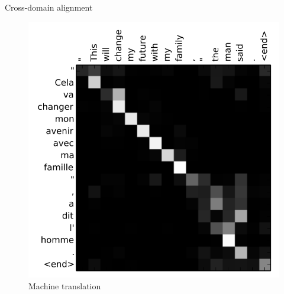 \documentclass{beamer}
\newcommand{\gw}{\text{GW}}
\newcommand{\gh}{\text{GH}}
\newcommand{\rmd}{\mathrm{d}}
\begin{document}




\begin{frame}{Cross-domain alignment}
  \begin{figure}
    \centering
    \includegraphics[width=0.65\linewidth, keepaspectratio=true]{OT_new/translation.png}
    \caption*{\scriptsize{Machine translation \parencite{Bahdanau15}}}
  \end{figure}
\end{frame}
\end{document}
